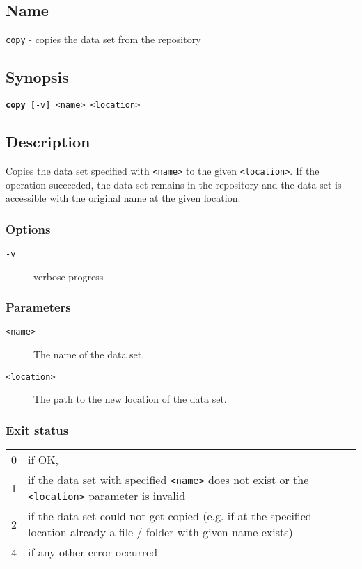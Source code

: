 \documentclass{article} %
\begin{document}
		\subsection*{Name}
		\texttt{copy} - copies the data set from the repository
		\subsection*{Synopsis}
		\texttt{\textbf{copy} [-v] <name> <location>}
		\subsection*{Description}
		Copies the data set specified with \texttt{<name>} to the given \texttt{<location>}.
		If the operation succeeded, the data set remains in the repository and the data set is accessible with the original name at the given location.\\
		
		\noindent
		\subsubsection*{Options}
		\begin{description}
			\item[\texttt{-v}] verbose progress
		\end{description}
		
		\subsubsection*{Parameters}
		\begin{description}
			\item[\texttt{<name>}] The name of the data set.
			\item[\texttt{<location>}] The path to the new location of the data set.
		\end{description}
		\subsubsection*{Exit status}
		\begin{tabular}{ll}
			0 &  if OK,\\ 
			1 &  if the data set with specified \texttt{<name>} does not exist or the \texttt{<location>} parameter is invalid\\
			2 &  if the data set could not get copied (e.g. if at the specified location already a file / folder with given name exists)\\
			4 &  if any other error occurred\\
		\end{tabular}
		
\end{document}
